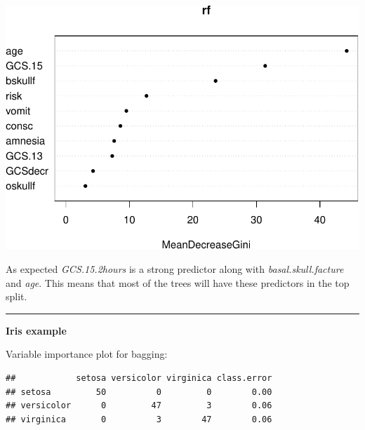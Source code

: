 \documentclass[]{article}
\newenvironment{Shaded}{\begin{snugshade}}{\end{snugshade}}
\newcommand{\CommentTok}[1]{\textcolor[rgb]{0.56,0.35,0.01}{\textit{#1}}}
\newcommand{\DataTypeTok}[1]{\textcolor[rgb]{0.13,0.29,0.53}{#1}}
\newcommand{\DecValTok}[1]{\textcolor[rgb]{0.00,0.00,0.81}{#1}}
\newcommand{\KeywordTok}[1]{\textcolor[rgb]{0.13,0.29,0.53}{\textbf{#1}}}
\newcommand{\NormalTok}[1]{#1}
\newcommand{\OperatorTok}[1]{\textcolor[rgb]{0.81,0.36,0.00}{\textbf{#1}}}
\newcommand{\StringTok}[1]{\textcolor[rgb]{0.31,0.60,0.02}{#1}}
\begin{document}
\includegraphics{8Trees_files/figure-latex/unnamed-chunk-35-3.pdf}

As expected \emph{GCS.15.2hours} is a strong predictor along with
\emph{basal.skull.facture} and \emph{age}. This means that most of the
trees will have these predictors in the top split.

\begin{center}\rule{0.5\linewidth}{\linethickness}\end{center}

\textbf{Iris example}

Variable importance plot for bagging:

\begin{Shaded}
\end{Shaded}

\begin{verbatim}
##            setosa versicolor virginica class.error
## setosa         50          0         0        0.00
## versicolor      0         47         3        0.06
## virginica       0          3        47        0.06
\end{verbatim}
\end{document}
